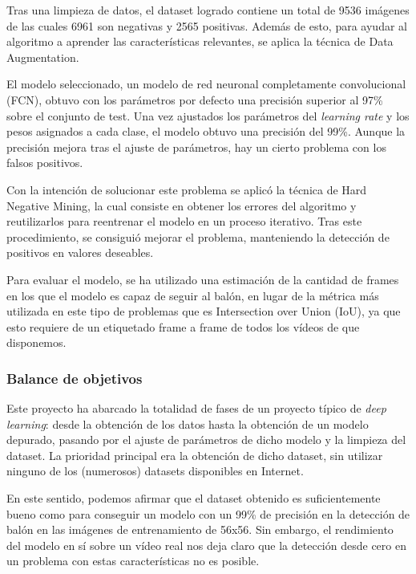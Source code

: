 Tras una limpieza de datos, el dataset logrado contiene un total de 9536 imágenes de las cuales 6961 son negativas y 2565 positivas. Además de esto, para ayudar al algoritmo a aprender las características relevantes, se aplica la técnica de Data Augmentation.

El modelo seleccionado, un modelo de red neuronal completamente convolucional (FCN), obtuvo con los parámetros por defecto una precisión superior al 97\% sobre el conjunto de test. Una vez ajustados los parámetros del \textit{learning rate} y los pesos asignados a cada clase, el modelo obtuvo una precisión del 99\%. Aunque la precisión mejora tras el ajuste de parámetros, hay un cierto problema con los falsos positivos.

Con la intención de solucionar este problema se aplicó la técnica de Hard Negative Mining, la cual consiste en obtener los errores del algoritmo y reutilizarlos para reentrenar el modelo en un proceso iterativo. Tras este procedimiento, se consiguió mejorar el problema, manteniendo la detección de positivos en valores deseables.

Para evaluar el modelo, se ha utilizado una estimación de la cantidad de frames en los que el modelo es capaz de seguir al balón, en lugar de la métrica más utilizada en este tipo de problemas que es Intersection over Union (IoU), ya que esto requiere de un etiquetado frame a frame de todos los vídeos de que disponemos. 




\subsubsection*{Balance de objetivos}

Este proyecto ha abarcado la totalidad de fases de un proyecto típico de \textit{deep learning}: desde la obtención de los datos hasta la obtención de un modelo depurado, pasando por el ajuste de parámetros de dicho modelo y la limpieza del dataset. La prioridad principal era la obtención de dicho dataset, sin utilizar ninguno de los (numerosos) datasets disponibles en Internet.

En este sentido, podemos afirmar que el dataset obtenido es suficientemente bueno como para conseguir un modelo con un 99\% de precisión en la detección de balón en las imágenes de entrenamiento de 56x56. Sin embargo, el rendimiento del modelo en sí sobre un vídeo real nos deja claro que la detección desde cero en un problema con estas características no es posible.

